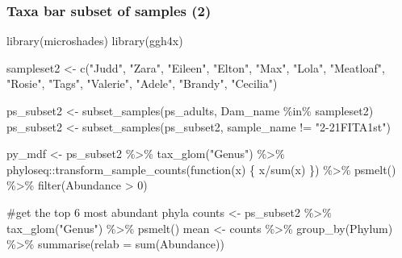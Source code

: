 \documentclass[
  letterpaper,
  DIV=11,
  numbers=noendperiod]{scrartcl}
\newenvironment{Shaded}{\begin{snugshade}}{\end{snugshade}}
\newcommand{\AttributeTok}[1]{\textcolor[rgb]{0.40,0.45,0.13}{#1}}
\newcommand{\CommentTok}[1]{\textcolor[rgb]{0.37,0.37,0.37}{#1}}
\newcommand{\ControlFlowTok}[1]{\textcolor[rgb]{0.00,0.23,0.31}{#1}}
\newcommand{\DecValTok}[1]{\textcolor[rgb]{0.68,0.00,0.00}{#1}}
\newcommand{\FunctionTok}[1]{\textcolor[rgb]{0.28,0.35,0.67}{#1}}
\newcommand{\NormalTok}[1]{\textcolor[rgb]{0.00,0.23,0.31}{#1}}
\newcommand{\OtherTok}[1]{\textcolor[rgb]{0.00,0.23,0.31}{#1}}
\newcommand{\SpecialCharTok}[1]{\textcolor[rgb]{0.37,0.37,0.37}{#1}}
\newcommand{\StringTok}[1]{\textcolor[rgb]{0.13,0.47,0.30}{#1}}
\begin{document}
\subsubsection{Taxa bar subset of samples
(2)}\label{taxa-bar-subset-of-samples-2}

\begin{Shaded}
\begin{Highlighting}[]
\FunctionTok{library}\NormalTok{(microshades)}
\FunctionTok{library}\NormalTok{(ggh4x)}

\NormalTok{sampleset2 }\OtherTok{\textless{}{-}} \FunctionTok{c}\NormalTok{(}\StringTok{"Judd"}\NormalTok{, }\StringTok{"Zara"}\NormalTok{, }\StringTok{"Eileen"}\NormalTok{, }\StringTok{"Elton"}\NormalTok{,}
                \StringTok{"Max"}\NormalTok{, }\StringTok{"Lola"}\NormalTok{, }\StringTok{"Meatloaf"}\NormalTok{, }\StringTok{"Rosie"}\NormalTok{,}
                \StringTok{"Tags"}\NormalTok{, }\StringTok{"Valerie"}\NormalTok{, }\StringTok{"Adele"}\NormalTok{, }\StringTok{"Brandy"}\NormalTok{,}
                \StringTok{"Cecilia"}\NormalTok{)}

\NormalTok{ps\_subset2 }\OtherTok{\textless{}{-}} \FunctionTok{subset\_samples}\NormalTok{(ps\_adults, }
\NormalTok{                             Dam\_name }\SpecialCharTok{\%in\%}\NormalTok{ sampleset2)}
\NormalTok{ps\_subset2 }\OtherTok{\textless{}{-}} \FunctionTok{subset\_samples}\NormalTok{(ps\_subset2, }
\NormalTok{                             sample\_name }\SpecialCharTok{!=} \StringTok{"2{-}21FITA1st"}\NormalTok{)}




\NormalTok{py\_mdf }\OtherTok{\textless{}{-}}\NormalTok{ ps\_subset2 }\SpecialCharTok{\%\textgreater{}\%}
  \FunctionTok{tax\_glom}\NormalTok{(}\StringTok{"Genus"}\NormalTok{) }\SpecialCharTok{\%\textgreater{}\%}
\NormalTok{  phyloseq}\SpecialCharTok{::}\FunctionTok{transform\_sample\_counts}\NormalTok{(}\ControlFlowTok{function}\NormalTok{(x) \{ x}\SpecialCharTok{/}\FunctionTok{sum}\NormalTok{(x) \}) }\SpecialCharTok{\%\textgreater{}\%}
  \FunctionTok{psmelt}\NormalTok{() }\SpecialCharTok{\%\textgreater{}\%}
  \FunctionTok{filter}\NormalTok{(Abundance }\SpecialCharTok{\textgreater{}} \DecValTok{0}\NormalTok{)}

\CommentTok{\#get the top 6 most abundant phyla}
\NormalTok{counts }\OtherTok{\textless{}{-}}\NormalTok{ ps\_subset2 }\SpecialCharTok{\%\textgreater{}\%}
  \FunctionTok{tax\_glom}\NormalTok{(}\StringTok{"Genus"}\NormalTok{) }\SpecialCharTok{\%\textgreater{}\%}
  \FunctionTok{psmelt}\NormalTok{()}
\NormalTok{mean }\OtherTok{\textless{}{-}}\NormalTok{ counts }\SpecialCharTok{\%\textgreater{}\%}
  \FunctionTok{group\_by}\NormalTok{(Phylum) }\SpecialCharTok{\%\textgreater{}\%}
  \FunctionTok{summarise}\NormalTok{(}\AttributeTok{relab =} \FunctionTok{sum}\NormalTok{(Abundance))}


\end{Highlighting}
\end{Shaded}
\end{document}
